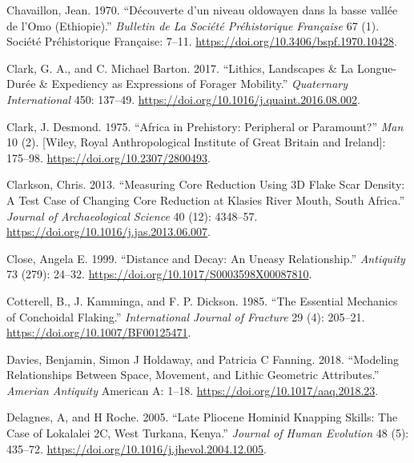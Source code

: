 \documentclass[]{elsarticle} %
\begin{document}
\leavevmode\hypertarget{ref-chavaillonDecouverteNiveauOldowayen1970}{}%
Chavaillon, Jean. 1970. ``Découverte d'un niveau oldowayen dans la basse
vallée de l'Omo (Ethiopie).'' \emph{Bulletin de La Société Préhistorique
Française} 67 (1). Société Préhistorique Française: 7--11.
\url{https://doi.org/10.3406/bspf.1970.10428}.

\leavevmode\hypertarget{ref-clarkLithicsLandscapesLongueduree2017}{}%
Clark, G. A., and C. Michael Barton. 2017. ``Lithics, Landscapes \& La
Longue-Durée \& Expediency as Expressions of Forager Mobility.''
\emph{Quaternary International} 450: 137--49.
\url{https://doi.org/10.1016/j.quaint.2016.08.002}.

\leavevmode\hypertarget{ref-clarkAfricaPrehistoryPeripheral1975}{}%
Clark, J. Desmond. 1975. ``Africa in Prehistory: Peripheral or
Paramount?'' \emph{Man} 10 (2). {[}Wiley, Royal Anthropological
Institute of Great Britain and Ireland{]}: 175--98.
\url{https://doi.org/10.2307/2800493}.

\leavevmode\hypertarget{ref-clarksonMeasuringCoreReduction2013}{}%
Clarkson, Chris. 2013. ``Measuring Core Reduction Using 3D Flake Scar
Density: A Test Case of Changing Core Reduction at Klasies River Mouth,
South Africa.'' \emph{Journal of Archaeological Science} 40 (12):
4348--57. \url{https://doi.org/10.1016/j.jas.2013.06.007}.

\leavevmode\hypertarget{ref-closeDistanceDecayUneasy1999}{}%
Close, Angela E. 1999. ``Distance and Decay: An Uneasy Relationship.''
\emph{Antiquity} 73 (279): 24--32.
\url{https://doi.org/10.1017/S0003598X00087810}.

\leavevmode\hypertarget{ref-cotterellEssentialMechanicsConchoidal1985}{}%
Cotterell, B., J. Kamminga, and F. P. Dickson. 1985. ``The Essential
Mechanics of Conchoidal Flaking.'' \emph{International Journal of
Fracture} 29 (4): 205--21. \url{https://doi.org/10.1007/BF00125471}.

\leavevmode\hypertarget{ref-daviesModelingRelationshipsSpace2018}{}%
Davies, Benjamin, Simon J Holdaway, and Patricia C Fanning. 2018.
``Modeling Relationships Between Space, Movement, and Lithic Geometric
Attributes.'' \emph{Amerian Antiquity} American A: 1--18.
\url{https://doi.org/10.1017/aaq.2018.23}.

\leavevmode\hypertarget{ref-delagnesLatePlioceneHominid2005}{}%
Delagnes, A, and H Roche. 2005. ``Late Pliocene Hominid Knapping Skills:
The Case of Lokalalei 2C, West Turkana, Kenya.'' \emph{Journal of Human
Evolution} 48 (5): 435--72.
\url{https://doi.org/10.1016/j.jhevol.2004.12.005}.
\end{document}
